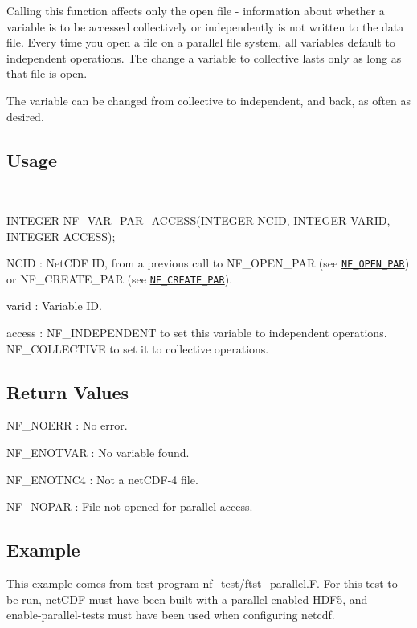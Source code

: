 Calling this function affects only the open file -\/ information about whether a variable is to be accessed collectively or independently is not written to the data file. Every time you open a file on a parallel file system, all variables default to independent operations. The change a variable to collective lasts only as long as that file is open.

The variable can be changed from collective to independent, and back, as often as desired.

\subsection*{Usage }

 

I\+N\+T\+E\+G\+ER N\+F\+\_\+\+V\+A\+R\+\_\+\+P\+A\+R\+\_\+\+A\+C\+C\+E\+S\+S(\+I\+N\+T\+E\+G\+E\+R N\+C\+I\+D, I\+N\+T\+E\+G\+E\+R V\+A\+R\+I\+D, I\+N\+T\+E\+G\+E\+R A\+C\+C\+E\+S\+S);

{\ttfamily N\+C\+ID} \+: Net\+C\+DF ID, from a previous call to N\+F\+\_\+\+O\+P\+E\+N\+\_\+\+P\+AR (see \href{#NF_005fOPEN_005fPAR}{\tt N\+F\+\_\+\+O\+P\+E\+N\+\_\+\+P\+AR}) or N\+F\+\_\+\+C\+R\+E\+A\+T\+E\+\_\+\+P\+AR (see \href{#NF_005fCREATE_005fPAR}{\tt N\+F\+\_\+\+C\+R\+E\+A\+T\+E\+\_\+\+P\+AR}).

{\ttfamily varid} \+: Variable ID.

{\ttfamily access} \+: N\+F\+\_\+\+I\+N\+D\+E\+P\+E\+N\+D\+E\+NT to set this variable to independent operations. N\+F\+\_\+\+C\+O\+L\+L\+E\+C\+T\+I\+VE to set it to collective operations.

\subsection*{Return Values }

{\ttfamily N\+F\+\_\+\+N\+O\+E\+RR} \+: No error.

{\ttfamily N\+F\+\_\+\+E\+N\+O\+T\+V\+AR} \+: No variable found.

{\ttfamily N\+F\+\_\+\+E\+N\+O\+T\+N\+C4} \+: Not a net\+C\+D\+F-\/4 file.

{\ttfamily N\+F\+\_\+\+N\+O\+P\+AR} \+: File not opened for parallel access.

\subsection*{Example }

This example comes from test program nf\+\_\+test/ftst\+\_\+parallel.\+F. For this test to be run, net\+C\+DF must have been built with a parallel-\/enabled H\+D\+F5, and –enable-\/parallel-\/tests must have been used when configuring netcdf.

